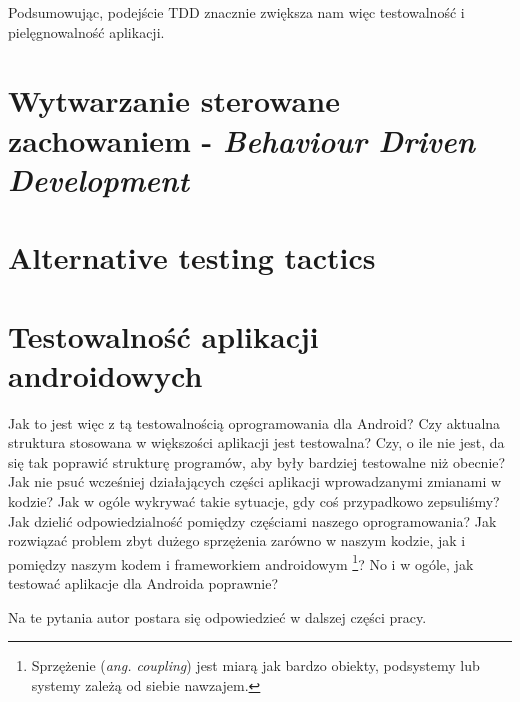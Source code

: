 Podsumowując, podejście TDD znacznie zwiększa nam więc testowalność i pielęgnowalność aplikacji. 

\section{Wytwarzanie sterowane zachowaniem - \textit{Behaviour Driven Development}}
\label{behaviour_driven_development}


\section{Alternative testing tactics}

\section{Testowalność aplikacji androidowych}
Jak to jest więc z tą testowalnością oprogramowania dla Android? Czy aktualna struktura stosowana w większości aplikacji jest testowalna? Czy, o ile nie jest, da się tak poprawić strukturę programów, aby były bardziej testowalne niż obecnie? Jak nie psuć wcześniej działających części aplikacji wprowadzanymi zmianami w kodzie? Jak w ogóle wykrywać takie sytuacje, gdy coś przypadkowo zepsuliśmy? Jak dzielić odpowiedzialność pomiędzy częściami naszego oprogramowania? Jak rozwiązać problem zbyt dużego sprzężenia zarówno w naszym kodzie, jak i pomiędzy naszym kodem i frameworkiem androidowym \footnote{Sprzężenie (\textit{ang. coupling}) jest miarą jak bardzo obiekty, podsystemy lub systemy zależą od siebie nawzajem.}? No i w ogóle, jak testować aplikacje dla Androida poprawnie?

Na te pytania autor postara się odpowiedzieć w dalszej części pracy.



